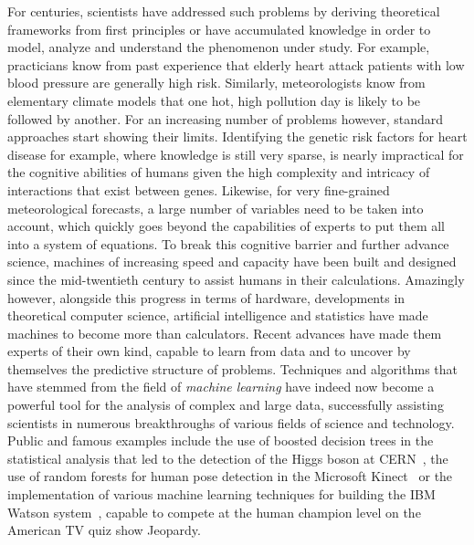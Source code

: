 For centuries, scientists have addressed such problems by deriving
theoretical frameworks from first principles or have accumulated knowledge in
order to model, analyze and understand the pheno\-menon under study. For
example, practicians know from past experience that elderly heart attack
patients with low blood pressure are generally high risk. Similarly,
meteorologists know from elementary climate models that one hot, high pollution
day is likely to be followed by another. For an increasing number of problems
however, standard approaches start showing their limits. Identifying the
genetic risk factors for heart disease for example, where knowledge is still
very sparse, is nearly impractical for the cognitive abilities of humans given
the high complexity and intricacy of interactions that exist between genes.
Likewise, for very fine-grained meteorological forecasts, a large number of
variables need to be taken into account, which quickly goes beyond the
capabilities of experts to put them all into a system of equations. To break
this cognitive barrier and further advance science, machines of increasing
speed and capacity have been built and designed since the mid-twentieth century
to assist humans in their calculations. Amazingly however, alongside this progress in
terms of hardware, developments in theoretical computer science, artificial
intelligence and statistics have made machines to become more than calculators.
Recent advances have made them experts of their own kind, capable to learn from
data and to uncover by themselves the predictive structure of problems.
Techniques and algorithms that have stemmed from the field of {\it machine
learning} have indeed now become a powerful tool for the analysis of complex and large
data, successfully assisting scientists in numerous breakthroughs of various
fields of science and technology. Public and famous examples include the use
of boosted decision trees in the statistical analysis that led to the detection
of the Higgs boson at CERN~\citep{chatrchyan:2012}, the use of random forests
for human pose detection in the Microsoft Kinect~\citep{criminisi:2013} or
the implementation of various machine learning techniques for building
the IBM Watson system~\citep{ferrucci:2010}, capable to compete at the human
champion level on the American TV quiz show Jeopardy.

